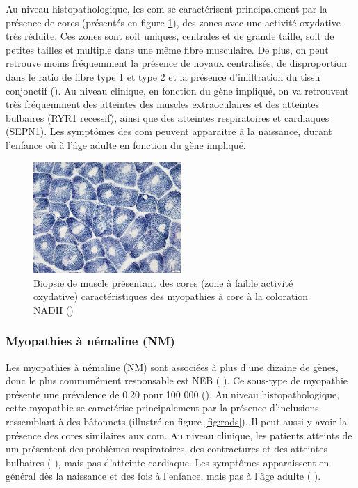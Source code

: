 Au niveau histopathologique, les \gls{com} se caractérisent principalement par la présence de cores (présentés en figure \ref{fig:cores}), des zones avec une activité oxydative très réduite. Ces zones sont soit uniques, centrales et de grande taille, soit de petites tailles et multiple dans une même fibre musculaire. De plus, on peut retrouve moins fréquemment la présence de noyaux centralisés, de disproportion dans le ratio de fibre type 1 et type 2 et la présence d'infiltration du tissu conjonctif (\cite{jungbluth_congenital_2018}). Au niveau clinique, en fonction du gène impliqué, on va retrouvent très fréquemment des atteintes des muscles extraoculaires et des atteintes bulbaires (RYR1 recessif), ainsi que des atteintes respiratoires et cardiaques (SEPN1). Les  symptômes des \gls{com} peuvent apparaitre à la naissance, durant l'enfance où à l'âge adulte en fonction du gène impliqué.

\begin{figure}[!ht]
 \centering
 \includegraphics[width=0.5\textwidth]{figures/core.jpg}
 \caption[Biopsie de muscle de myopathies à cores]{Biopsie de muscle présentant des cores (zone à faible activité oxydative) caractéristiques des myopathies à core à la coloration NADH (\cite{alan_pestronk_neuromuscular_2022})}
 \label{fig:cores}
\end{figure}

\subsubsection{Myopathies à némaline (NM)}
Les myopathies à némaline (NM) sont associées à plus d'une dizaine de gènes, donc le plus communément responsable est NEB (\cite{jungbluth_congenital_2018} ). Ce sous-type de myopathie présente une prévalence de 0,20 pour 100 000 (\cite{huang_systematic_2021}). Au niveau histopathologique, cette myopathie se caractérise principalement par la présence d'inclusions ressemblant à des bâtonnets (illustré en figure \ref{fig:rods}). Il peut aussi y avoir la présence des cores similaires aux \gls{com}. Au niveau clinique, les patients atteints de \gls{nm} présentent des problèmes respiratoires, des contractures et des atteintes bulbaires (\cite{jungbluth_congenital_2018} ), mais pas d'atteinte cardiaque. Les symptômes apparaissent en général dès la naissance et des fois à l'enfance, mais pas à l'âge adulte (\cite{jungbluth_congenital_2018} ).


